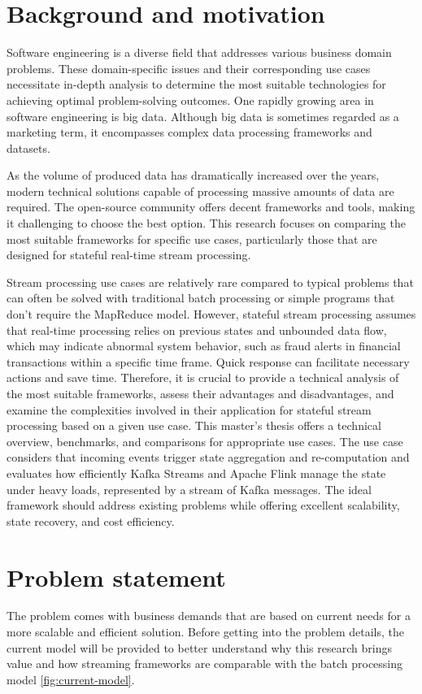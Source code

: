 \section{Background and motivation}\label{sec:back-and-motiv}
Software engineering is a diverse field that addresses various business domain problems.
These domain-specific issues and their corresponding use cases necessitate in-depth analysis to determine the most suitable technologies for achieving optimal problem-solving outcomes.
One rapidly growing area in software engineering is big data.
Although big data is sometimes regarded as a marketing term, it encompasses complex data processing frameworks and datasets.

As the volume of produced data has dramatically increased over the years, modern technical solutions capable of processing massive amounts of data are required.
The open-source community offers decent frameworks and tools, making it challenging to choose the best option.
This research focuses on comparing the most suitable frameworks for specific use cases, particularly those that are designed for stateful real-time stream processing.

Stream processing use cases are relatively rare compared to typical problems that can often
be solved with traditional batch processing or simple programs that don't require the MapReduce model.
However, stateful stream processing assumes that real-time processing relies on previous states and unbounded data flow, which may indicate abnormal system behavior, such as fraud alerts in financial transactions
within a specific time frame.
Quick response can facilitate necessary actions and save time.
Therefore, it is crucial to provide a technical analysis of the most suitable frameworks, assess their advantages and disadvantages, and examine the complexities involved in their application for stateful stream processing based on a given use case.
This master's thesis offers a technical overview, benchmarks, and comparisons for appropriate use cases.
The use case considers that incoming events trigger state aggregation and re-computation and evaluates how efficiently Kafka Streams \cite{kafka_streams_intro} and Apache Flink \cite{flink_intro} manage the state under heavy loads, represented by a stream of Kafka \cite{kafka_intro} messages.
The ideal framework should address existing problems while offering excellent scalability, state recovery, and cost efficiency.

\newpage
\section{Problem statement}\label{sec:prob-st}
The problem comes with business demands that are based on current needs for a more scalable and efficient solution.
Before getting into the problem details, the current model will be provided to better understand why this research
brings value and how streaming frameworks are comparable with the batch processing model \ref{fig:current-model}.

